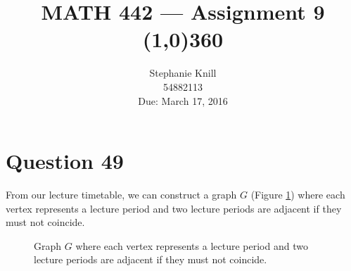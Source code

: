 \documentclass[11pt, oneside]{article}   	%
\begin{document}
\title{MATH 442 --- Assignment 9 \\
\line(1,0){360} \\              %
}
\author{
Stephanie Knill \\
54882113 \\
Due: March 17, 2016}

\date{}                   %
\maketitle




\section*{Question 49}

From our lecture timetable, we can construct a graph $G$ (Figure \ref{q1}) where each vertex represents a lecture period and two lecture periods are adjacent if they must not coincide.

\begin{figure}[h]
	\centering
        \caption{Graph $G$ where each vertex represents a lecture period and two lecture periods are adjacent if they must not coincide.}
        \label{q1}
 \end{figure}
\end{document}
